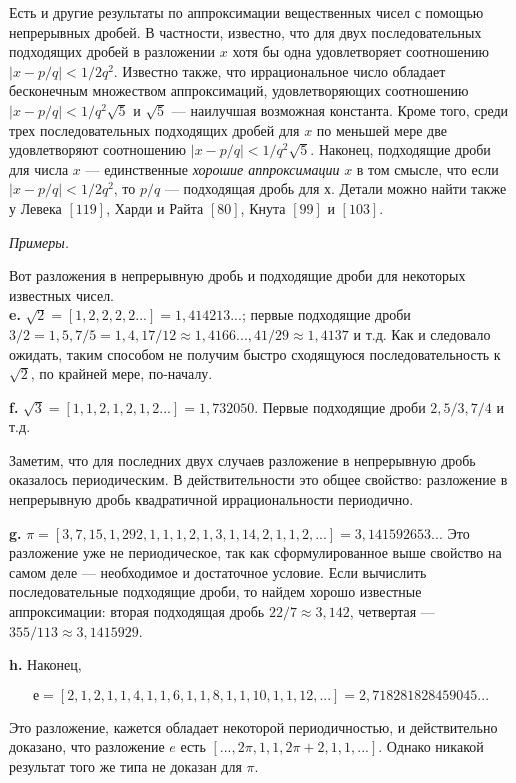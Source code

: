 \documentclass{mai_book}
\begin{document}
\begin{mynotice}
Есть и другие результаты по аппроксимации вещественных чисел
с помощью непрерывных дробей. В частности, известно, что для двух
последовательных подходящих дробей в разложении $x$ хотя бы одна
удовлетворяет соотношению $|x-p/q| < 1/2q^2$. Известно также, что
иррациональное число обладает бесконечным множеством 
аппроксимаций, удовлетворяющих соотношению $|x-p/q| < 1/q^2 \sqrt{5}$ и $\sqrt{5}$ — наилучшая возможная константа. Кроме того, среди трех последовательных подходящих дробей для $x$ по меньшей мере две удовлетворяют 
соотношению $|x-p/q| < 1/q^2 \sqrt{5}$. Наконец, подходящие дроби для числа
$x$ — единственные \textit{хорошие аппроксимации} $x$ в том смысле, что если
$|x-p/q| < 1/2q^2$, то $p/q$ — подходящая дробь для $х$. Детали можно
найти также у Левека $[119]$, Харди и Райта $[80]$, Кнута $[99]$ и $[103]$.
\end{mynotice}

\noindent \textit{Примеры.}

Вот разложения в непрерывную дробь и подходящие дроби для 
некоторых известных чисел.
\\

\textbf{e.} $\sqrt{2} = [1,2,2,2,2...] = 1,414213...$; первые подходящие дроби $3/2 = 1,5, 7/5 = 1,4, 17/12 \approx 1,4166..., 41/29 \approx 1,4137$ и т.д. Как и следовало ожидать, таким способом не получим быстро сходящуюся
последовательность к $\sqrt{2}$, по крайней мере, по-началу.

\textbf{f.} $\sqrt{3} = [1,1,2,1,2,1,2...] = 1,732050$. Первые подходящие дроби $2, 5/3, 7/4$ и т.д.

Заметим, что для последних двух случаев разложение в непрерывную дробь оказалось периодическим. В действительности это общее свойство: разложение в непрерывную дробь квадратичной иррациональности периодично.

\textbf{g.} $\pi = [3,7,15,1,292,1,1,1,2,1,3,1,14,2,1,1,2,...] = 3,141592653...$ Это разложение уже не периодическое, так как сформулированное 
выше свойство на самом деле — необходимое и достаточное условие. Если вычислить последовательные подходящие дроби, то найдем хорошо известные аппроксимации: вторая подходящая дробь $22/7 \approx 3,142$, 
четвертая — $355/113 \approx 3,1415929$.

\textbf{h.} Наконец,

\[
е = [2,1,2,1,1,4,1,1,6,1,1,8,1,1,10,1,1,12,...] = 2,718 281828459045...
\]

\noindent Это разложение, кажется обладает некоторой периодичностью, и 
действительно доказано, что разложение $e$ есть $[...,2\pi,1,1,2\pi+2,1,1,...]$. Однако никакой результат того же типа не доказан для $\pi$.
\\
\end{document}
